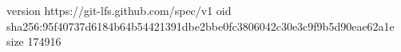 version https://git-lfs.github.com/spec/v1
oid sha256:95f40737d6184b64b54421391dbe2bbe0fc3806042c30e3c9f9b5d90eae62a1e
size 174916
